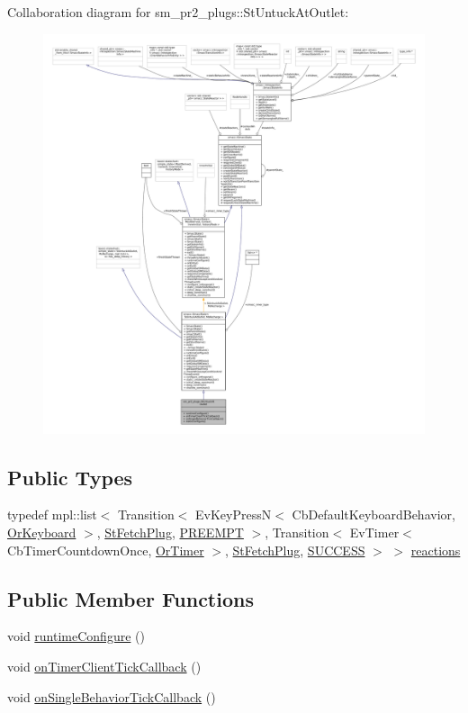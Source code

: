 Collaboration diagram for sm\+\_\+pr2\+\_\+plugs\+:\+:St\+Untuck\+At\+Outlet\+:
\nopagebreak
\begin{figure}[H]
\begin{center}
\leavevmode
\includegraphics[width=350pt]{structsm__pr2__plugs_1_1StUntuckAtOutlet__coll__graph}
\end{center}
\end{figure}
\subsection*{Public Types}
\begin{DoxyCompactItemize}
\item 
typedef mpl\+::list$<$ Transition$<$ Ev\+Key\+PressN$<$ Cb\+Default\+Keyboard\+Behavior, \hyperlink{classsm__pr2__plugs_1_1OrKeyboard}{Or\+Keyboard} $>$, \hyperlink{structsm__pr2__plugs_1_1StFetchPlug}{St\+Fetch\+Plug}, \hyperlink{classPREEMPT}{P\+R\+E\+E\+M\+PT} $>$, Transition$<$ Ev\+Timer$<$ Cb\+Timer\+Countdown\+Once, \hyperlink{classsm__pr2__plugs_1_1OrTimer}{Or\+Timer} $>$, \hyperlink{structsm__pr2__plugs_1_1StFetchPlug}{St\+Fetch\+Plug}, \hyperlink{classSUCCESS}{S\+U\+C\+C\+E\+SS} $>$ $>$ \hyperlink{structsm__pr2__plugs_1_1StUntuckAtOutlet_a77b0bad04ff5db4fc1a9b8557a435211}{reactions}
\end{DoxyCompactItemize}
\subsection*{Public Member Functions}
\begin{DoxyCompactItemize}
\item 
void \hyperlink{structsm__pr2__plugs_1_1StUntuckAtOutlet_a14d6ec782f8d78b6df0ef610508b0e9b}{runtime\+Configure} ()
\item 
void \hyperlink{structsm__pr2__plugs_1_1StUntuckAtOutlet_a51a908bc8b1908d8e548db64bc8a5528}{on\+Timer\+Client\+Tick\+Callback} ()
\item 
void \hyperlink{structsm__pr2__plugs_1_1StUntuckAtOutlet_a6a0c321350c11e8f393c34e7c85bf36a}{on\+Single\+Behavior\+Tick\+Callback} ()
\end{DoxyCompactItemize}
